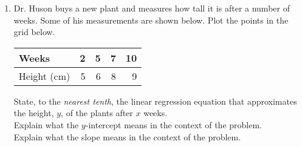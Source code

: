 \documentclass[12pt, twoside]{article}
\begin{document}
\begin{enumerate}
\newpage
\item Dr. Huson buys a new plant and measures how tall it is after a number of weeks. Some of his measurements are shown below. Plot the points in the grid below.
  \renewcommand{\arraystretch}{1.6}
    \begin{center}
      \begin{tabular}{|l|r|r|r|r|}
      \hline
      Weeks & 2 & 5 & 7 & 10\\
      \hline
      Height (cm) & 5 & 6 & 8 & 9 \\
      \hline
      \end{tabular}
    \end{center}

\begin{center} %
\end{center}
State, to the \emph{nearest tenth}, the linear regression equation that approximates the height, $y$, of the plants after $x$ weeks.\\[2cm]
Explain what the $y$-intercept means in the context of the problem. \\[3cm]
Explain what the slope means in the context of the problem.


\end{enumerate}
\end{document}
